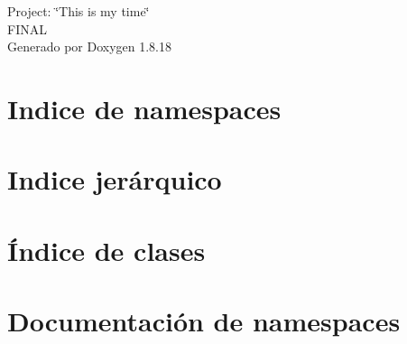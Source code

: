\let\mypdfximage\pdfximage\def\pdfximage{\immediate\mypdfximage}\documentclass[twoside]{book}
\newcommand{\+}{\discretionary{\mbox{\scriptsize$\hookleftarrow$}}{}{}}
\newcommand{\clearemptydoublepage}{%
  \newpage{\pagestyle{empty}\cleardoublepage}%
}
\begin{document}
\hypersetup{pageanchor=false,
             bookmarksnumbered=true,
             pdfencoding=unicode
            }
\begin{titlepage}
\vspace*{7cm}
\begin{center}%
{\Large Project\+: \char`\"{}\+This is my time\char`\"{} \\[1ex]\large F\+I\+N\+AL }\\
\vspace*{1cm}
{\large Generado por Doxygen 1.8.18}\\
\end{center}
\end{titlepage}
\clearemptydoublepage
{}
\tableofcontents
\clearemptydoublepage
{}
\hypersetup{pageanchor=true}

\chapter{Indice de namespaces}

\chapter{Indice jerárquico}

\chapter{Índice de clases}

\chapter{Documentación de namespaces}







\end{document}
